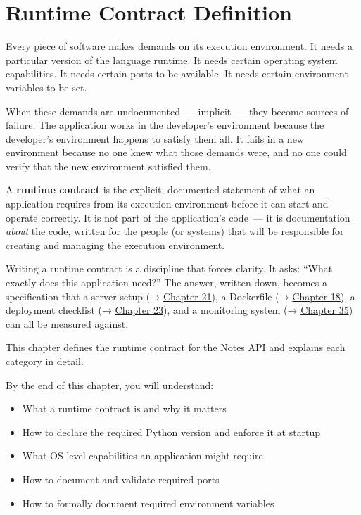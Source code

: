 \setcounter{chapter}{13}
\chapter{Runtime Contract Definition}\label{ch:14-runtime-contract}

\chapterrule

Every piece of software makes demands on its execution environment. It needs a particular version of the language runtime. It needs certain operating system capabilities. It needs certain ports to be available. It needs certain environment variables to be set.

When these demands are undocumented~--- implicit~--- they become sources of failure. The application works in the developer's environment because the developer's environment happens to satisfy them all. It fails in a new environment because no one knew what those demands were, and no one could verify that the new environment satisfied them.

A \textbf{runtime contract} is the explicit, documented statement of what an application requires from its execution environment before it can start and operate correctly. It is not part of the application's code~--- it is documentation \emph{about} the code, written for the people (or systems) that will be responsible for creating and managing the execution environment.

Writing a runtime contract is a discipline that forces clarity. It asks: ``What exactly does this application need?'' The answer, written down, becomes a specification that a server setup (→ \hyperref[ch:21-system-setup]{Chapter 21}), a Dockerfile (→ \hyperref[ch:18-containerization]{Chapter 18}), a deployment checklist (→ \hyperref[ch:23-code-transfer]{Chapter 23}), and a monitoring system (→ \hyperref[ch:35-observability]{Chapter 35}) can all be measured against.

This chapter defines the runtime contract for the Notes API and explains each category in detail.

\begin{objectives}

By the end of this chapter, you will understand:

\begin{itemize}
\tightlist
\item
  What a runtime contract is and why it matters
\item
  How to declare the required Python version and enforce it at startup
\item
  What OS-level capabilities an application might require
\item
  How to document and validate required ports
\item
  How to formally document required environment variables
\end{itemize}

\end{objectives}

